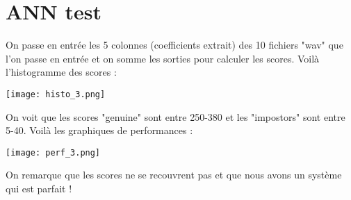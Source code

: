 \section{ANN test}

On passe en entrée les 5 colonnes (coefficients extrait) des 10 fichiers "wav" que l'on passe en entrée et on somme les sorties pour calculer les scores.  Voilà l'histogramme des scores :

\begin{center} 
\hspace{15cm}
\texttt{[image: histo\_3.png]}
\end{center}
\vspace{0.5cm} 

On voit que les scores "genuine" sont entre 250-380 et les "impostors" sont entre 5-40. Voilà les graphiques de performances :

\begin{center} 
\hspace{15cm}
\texttt{[image: perf\_3.png]}
\end{center}
\vspace{0.5cm} 

\pagebreak
On remarque que les scores ne se recouvrent pas et que nous avons un système qui est parfait !




 


 



